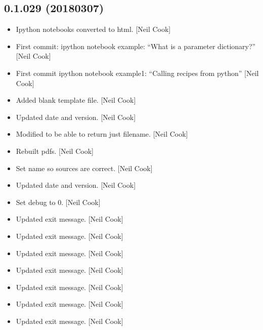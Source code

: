 \documentclass[a4paper,10pt,english]{report}
\begin{document}
\subsection{0.1.029 (2018\sphinxhyphen{}03\sphinxhyphen{}07)}
\label{\detokenize{misc/changelog:id494}}\begin{itemize}
\item {} 
Ipython notebooks converted to html. {[}Neil Cook{]}

\item {} 
First commit: ipython notebook example: “What is a parameter
dictionary?” {[}Neil Cook{]}

\item {} 
First commit ipython notebook example1: “Calling recipes from python”
{[}Neil Cook{]}

\item {} 
Added blank template file. {[}Neil Cook{]}

\item {} 
Updated date and version. {[}Neil Cook{]}

\item {} 
Modified  to be able to return just filename. {[}Neil
Cook{]}

\item {} 
Rebuilt pdfs. {[}Neil Cook{]}

\item {} 
Set  name so sources are correct. {[}Neil Cook{]}

\item {} 
Updated date and version. {[}Neil Cook{]}

\item {} 
Set debug to 0. {[}Neil Cook{]}

\item {} 
Updated exit message. {[}Neil Cook{]}

\item {} 
Updated exit message. {[}Neil Cook{]}

\item {} 
Updated exit message. {[}Neil Cook{]}

\item {} 
Updated exit message. {[}Neil Cook{]}

\item {} 
Updated exit message. {[}Neil Cook{]}

\item {} 
Updated exit message. {[}Neil Cook{]}

\item {} 
Updated exit message. {[}Neil Cook{]}


\end{itemize}
\end{document}
